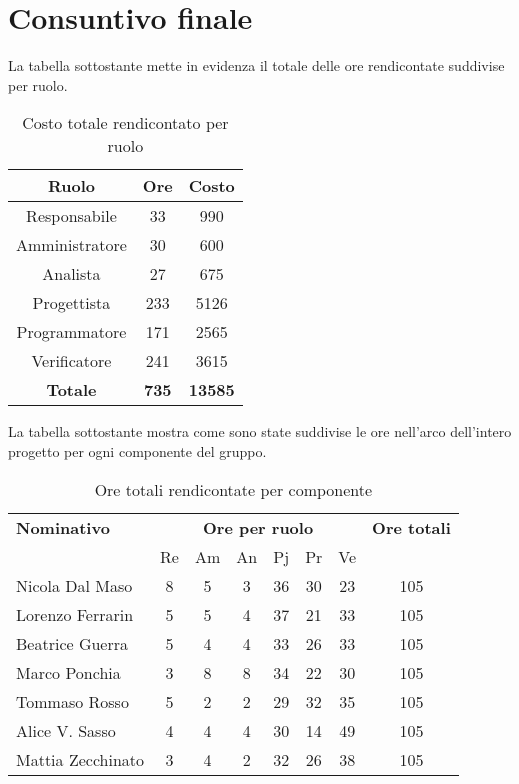 \section{Consuntivo finale}
La tabella sottostante mette in evidenza il totale delle ore rendicontate suddivise per ruolo.
\begin{table}[H]
	\centering
	\begin{tabular}{|c|c|c|}
		\hline
		\textbf{Ruolo} &
		\textbf{Ore} &
		\textbf{Costo} \\
		\hline
		Responsabile & 33 & 990\\
		\hline
		Amministratore & 30 & 600\\
		\hline
		Analista & 27 & 675\\
		\hline
		Progettista & 233 & 5126 \\
		\hline
		Programmatore & 171 & 2565 \\
		\hline
		Verificatore & 241 & 3615\\
		\hline
		\textbf{Totale} & \textbf{735} & \textbf{13585} \\
		\hline
	\end{tabular}
	\caption{Costo totale rendicontato per ruolo}
\end{table}

La tabella sottostante mostra come sono state suddivise le ore nell'arco dell'intero progetto per ogni componente del gruppo.
\begin{table}[H]
	\centering
	\begin{tabular}{|l|c|c|c|c|c|c|c|}
		\hline
		\textbf{Nominativo} & 
		\multicolumn{6}{c|}{\textbf{Ore per ruolo}} & 
		\textbf{Ore totali} \\
		& Re & Am & An & Pj & Pr & Ve & \\
		\hline
		Nicola Dal Maso &8 &5 &3 &36 &30 &23 & 105 \\
		Lorenzo Ferrarin &5 &5 &4 &37 &21 &33 & 105 \\
		Beatrice Guerra &5 &4 &4 &33 &26 &33 & 105 \\
		Marco Ponchia &3 &8 &8 &34 &22 &30 & 105 \\
		Tommaso Rosso &5 &2 &2 &29 &32 &35 & 105 \\
		Alice V. Sasso &4 &4 &4 &30 &14 &49 & 105 \\
		Mattia Zecchinato &3 &4 &2 &32 &26 &38 & 105 \\
		\hline
	\end{tabular}
	\caption{Ore totali rendicontate per componente}
\end{table}


